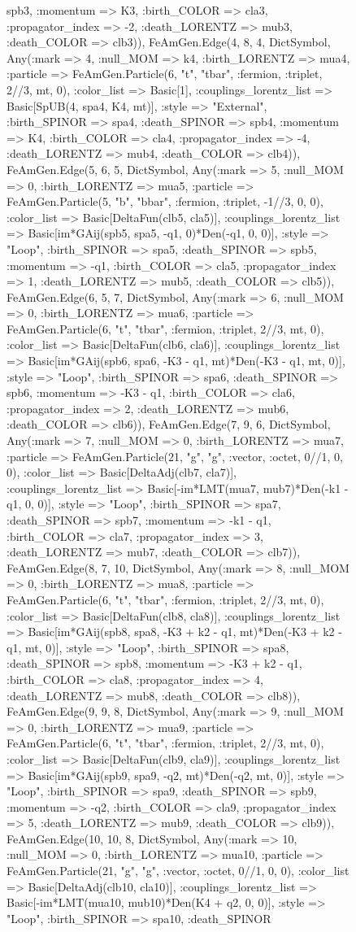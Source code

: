 \documentclass{revtex4}
\begin{document}
\begin{figure}[!htb]
\begin{center}
{spb3, :momentum => K3, :birth_COLOR => cla3, :propagator_index => -2, :death_LORENTZ => mub3, :death_COLOR => clb3)), FeAmGen.Edge(4, 8, 4, Dict{Symbol, Any}(:mark => 4, :null_MOM => k4, :birth_LORENTZ => mua4, :particle => FeAmGen.Particle(6, "t", "tbar", :fermion, :triplet, 2//3, mt, 0), :color_list => Basic[1], :couplings_lorentz_list => Basic[SpUB(4, spa4, K4, mt)], :style => "External", :birth_SPINOR => spa4, :death_SPINOR => spb4, :momentum => K4, :birth_COLOR => cla4, :propagator_index => -4, :death_LORENTZ => mub4, :death_COLOR => clb4)), FeAmGen.Edge(5, 6, 5, Dict{Symbol, Any}(:mark => 5, :null_MOM => 0, :birth_LORENTZ => mua5, :particle => FeAmGen.Particle(5, "b", "bbar", :fermion, :triplet, -1//3, 0, 0), :color_list => Basic[DeltaFun(clb5, cla5)], :couplings_lorentz_list => Basic[im*GAij(spb5, spa5, -q1, 0)*Den(-q1, 0, 0)], :style => "Loop", :birth_SPINOR => spa5, :death_SPINOR => spb5, :momentum => -q1, :birth_COLOR => cla5, :propagator_index => 1, :death_LORENTZ => mub5, :death_COLOR => clb5)), FeAmGen.Edge(6, 5, 7, Dict{Symbol, Any}(:mark => 6, :null_MOM => 0, :birth_LORENTZ => mua6, :particle => FeAmGen.Particle(6, "t", "tbar", :fermion, :triplet, 2//3, mt, 0), :color_list => Basic[DeltaFun(clb6, cla6)], :couplings_lorentz_list => Basic[im*GAij(spb6, spa6, -K3 - q1, mt)*Den(-K3 - q1, mt, 0)], :style => "Loop", :birth_SPINOR => spa6, :death_SPINOR => spb6, :momentum => -K3 - q1, :birth_COLOR => cla6, :propagator_index => 2, :death_LORENTZ => mub6, :death_COLOR => clb6)), FeAmGen.Edge(7, 9, 6, Dict{Symbol, Any}(:mark => 7, :null_MOM => 0, :birth_LORENTZ => mua7, :particle => FeAmGen.Particle(21, "g", "g", :vector, :octet, 0//1, 0, 0), :color_list => Basic[DeltaAdj(clb7, cla7)], :couplings_lorentz_list => Basic[-im*LMT(mua7, mub7)*Den(-k1 - q1, 0, 0)], :style => "Loop", :birth_SPINOR => spa7, :death_SPINOR => spb7, :momentum => -k1 - q1, :birth_COLOR => cla7, :propagator_index => 3, :death_LORENTZ => mub7, :death_COLOR => clb7)), FeAmGen.Edge(8, 7, 10, Dict{Symbol, Any}(:mark => 8, :null_MOM => 0, :birth_LORENTZ => mua8, :particle => FeAmGen.Particle(6, "t", "tbar", :fermion, :triplet, 2//3, mt, 0), :color_list => Basic[DeltaFun(clb8, cla8)], :couplings_lorentz_list => Basic[im*GAij(spb8, spa8, -K3 + k2 - q1, mt)*Den(-K3 + k2 - q1, mt, 0)], :style => "Loop", :birth_SPINOR => spa8, :death_SPINOR => spb8, :momentum => -K3 + k2 - q1, :birth_COLOR => cla8, :propagator_index => 4, :death_LORENTZ => mub8, :death_COLOR => clb8)), FeAmGen.Edge(9, 9, 8, Dict{Symbol, Any}(:mark => 9, :null_MOM => 0, :birth_LORENTZ => mua9, :particle => FeAmGen.Particle(6, "t", "tbar", :fermion, :triplet, 2//3, mt, 0), :color_list => Basic[DeltaFun(clb9, cla9)], :couplings_lorentz_list => Basic[im*GAij(spb9, spa9, -q2, mt)*Den(-q2, mt, 0)], :style => "Loop", :birth_SPINOR => spa9, :death_SPINOR => spb9, :momentum => -q2, :birth_COLOR => cla9, :propagator_index => 5, :death_LORENTZ => mub9, :death_COLOR => clb9)), FeAmGen.Edge(10, 10, 8, Dict{Symbol, Any}(:mark => 10, :null_MOM => 0, :birth_LORENTZ => mua10, :particle => FeAmGen.Particle(21, "g", "g", :vector, :octet, 0//1, 0, 0), :color_list => Basic[DeltaAdj(clb10, cla10)], :couplings_lorentz_list => Basic[-im*LMT(mua10, mub10)*Den(K4 + q2, 0, 0)], :style => "Loop", :birth_SPINOR => spa10, :death_SPINOR }
\end{center}
\end{figure}
\end{document}
